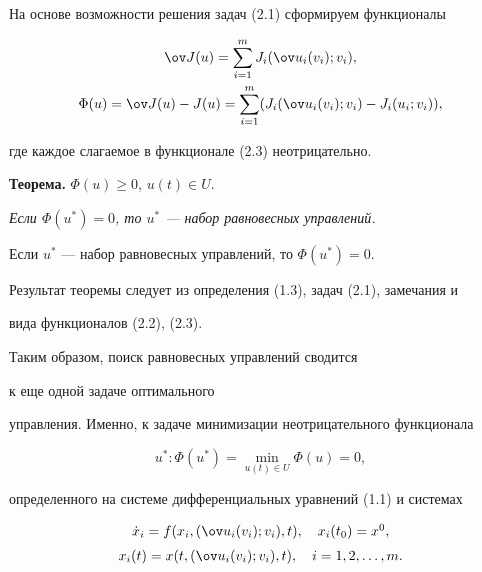 На основе возможности решения задач (2.1) сформируем функционалы


\begin{gather}


\ov J(u)=\sum_{i=1}^{m}J_{i}(\ov u_{i}(v_{i});v_{i}), \\


%


\Phi (u)=\ov J(u)-J(u)=\sum_{i=1}^{m}


(J_{i}(\ov u_{i}(v_{i});v_{i})-J_i(u_i;v_i)),


\end{gather}


где каждое слагаемое в функционале (2.3) неотрицательно.


\medskip





{\bf Теорема.} $\Phi(u)\geq 0$, $u(t)\in U$.


{\it Если $\Phi(u^{\ast})=0$, то $u^{\ast}$ --- набор равновесных управлений.


Если $u^{\ast}$ --- набор равновесных управлений, то $\Phi(u^{\ast})=0$.


}


\medskip





Результат теоремы следует из определения (1.3), задач (2.1), замечания и 


вида функционалов (2.2), (2.3).





Таким образом, поиск равновесных управлений сводится 


к еще одной задаче оптимального 


управления. Именно, к задаче минимизации неотрицательного функционала


\begin{equation}


u^{\ast}:\Phi(u^{\ast})=\min_{{u(t)\in U}}\Phi(u)=0,


\end{equation}


определенного на системе дифференциальных уравнений (1.1) и системах


\begin{equation}


\begin{array}{c}


\Dot x_{i}=f(x_i,(\ov u_i(v_i);v_i),t),\quad x_i(t_0)=x^0, \\[2mm]


%


x_i(t)=x(t,(\ov u_i(v_i);v_i),t),\quad i=1,2,\dotsc ,m.


\end{array}


\end{equation}


